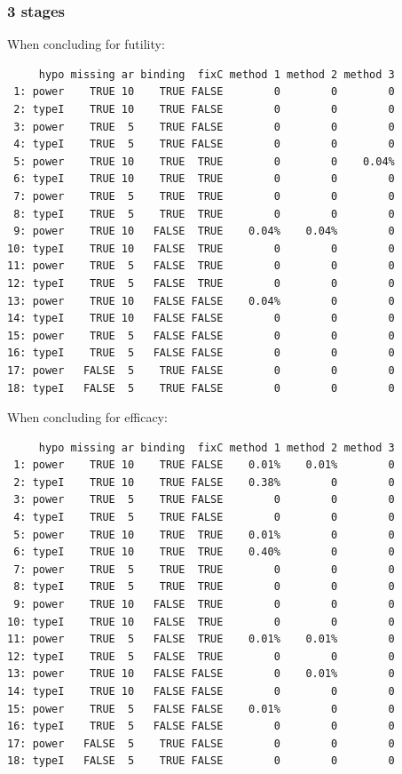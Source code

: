 \documentclass[12pt]{article}
\begin{document}
\clearpage

\subsubsection{3 stages}
\label{sec:org4b1aeb8}

When concluding for futility:
\begin{verbatim}
     hypo missing ar binding  fixC method 1 method 2 method 3
 1: power    TRUE 10    TRUE FALSE        0        0        0
 2: typeI    TRUE 10    TRUE FALSE        0        0        0
 3: power    TRUE  5    TRUE FALSE        0        0        0
 4: typeI    TRUE  5    TRUE FALSE        0        0        0
 5: power    TRUE 10    TRUE  TRUE        0        0    0.04%
 6: typeI    TRUE 10    TRUE  TRUE        0        0        0
 7: power    TRUE  5    TRUE  TRUE        0        0        0
 8: typeI    TRUE  5    TRUE  TRUE        0        0        0
 9: power    TRUE 10   FALSE  TRUE    0.04%    0.04%        0
10: typeI    TRUE 10   FALSE  TRUE        0        0        0
11: power    TRUE  5   FALSE  TRUE        0        0        0
12: typeI    TRUE  5   FALSE  TRUE        0        0        0
13: power    TRUE 10   FALSE FALSE    0.04%        0        0
14: typeI    TRUE 10   FALSE FALSE        0        0        0
15: power    TRUE  5   FALSE FALSE        0        0        0
16: typeI    TRUE  5   FALSE FALSE        0        0        0
17: power   FALSE  5    TRUE FALSE        0        0        0
18: typeI   FALSE  5    TRUE FALSE        0        0        0
\end{verbatim}

When concluding for efficacy:
\begin{verbatim}
     hypo missing ar binding  fixC method 1 method 2 method 3
 1: power    TRUE 10    TRUE FALSE    0.01%    0.01%        0
 2: typeI    TRUE 10    TRUE FALSE    0.38%        0        0
 3: power    TRUE  5    TRUE FALSE        0        0        0
 4: typeI    TRUE  5    TRUE FALSE        0        0        0
 5: power    TRUE 10    TRUE  TRUE    0.01%        0        0
 6: typeI    TRUE 10    TRUE  TRUE    0.40%        0        0
 7: power    TRUE  5    TRUE  TRUE        0        0        0
 8: typeI    TRUE  5    TRUE  TRUE        0        0        0
 9: power    TRUE 10   FALSE  TRUE        0        0        0
10: typeI    TRUE 10   FALSE  TRUE        0        0        0
11: power    TRUE  5   FALSE  TRUE    0.01%    0.01%        0
12: typeI    TRUE  5   FALSE  TRUE        0        0        0
13: power    TRUE 10   FALSE FALSE        0    0.01%        0
14: typeI    TRUE 10   FALSE FALSE        0        0        0
15: power    TRUE  5   FALSE FALSE    0.01%        0        0
16: typeI    TRUE  5   FALSE FALSE        0        0        0
17: power   FALSE  5    TRUE FALSE        0        0        0
18: typeI   FALSE  5    TRUE FALSE        0        0        0
\end{verbatim}
\end{document}
